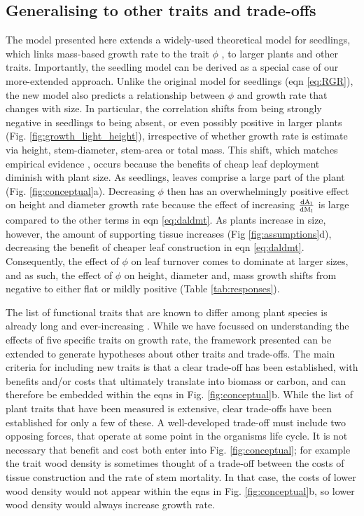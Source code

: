 \documentclass[a4paper,11pt]{article}
\begin{document}
\subsection{Generalising to other traits and trade-offs}


The model presented here extends a widely-used theoretical model for seedlings, which links mass-based growth rate to the trait $\phi$ \citep{Lambers-1992, Wright-2000}, to larger plants and other traits. Importantly, the seedling model can be derived as a special case of our more-extended approach. Unlike the original model for seedlings (eqn \ref{eq:RGR}), the new model also predicts a relationship between $\phi$ and growth rate that changes with size. In particular, the correlation shifts from being strongly negative in seedlings to being absent, or even possibly positive in larger plants (Fig. \ref{fig:growth_light_height}), irrespective of whether growth rate is estimate via height, stem-diameter, stem-area or total mass. This shift, which matches empirical evidence \citep{Poorter-2008, Wright-2010, Herault-2011, Paine-2015, Gibert-2016}, occurs because the benefits of cheap leaf deployment diminish with plant size. As seedlings, leaves comprise a large part of the plant (Fig. \ref{fig:conceptual}a). Decreasing $\phi$ then has an overwhelmingly positive effect on height and diameter growth rate because the effect of increasing $\frac{\rm{d} A_{\rm l}}{\rm{d} M_{\rm l}}$ is large compared to the other terms in eqn \ref{eq:daldmt}. As plants increase in size, however, the amount of supporting tissue increases (Fig \ref{fig:assumptions}d), decreasing the benefit of cheaper leaf construction in eqn \ref{eq:daldmt}. Consequently, the effect of $\phi$ on leaf turnover comes to dominate at larger sizes, and as such, the effect of $\phi$ on height, diameter and, mass growth shifts from negative to either flat or mildly positive  (Table \ref{tab:responses}).

The list of functional traits that are known to differ among plant species is already long and ever-increasing \citep{Perez-2013}. While we have focussed on understanding the effects of five specific traits on growth rate, the framework presented can be extended to generate hypotheses about other traits and trade-offs. The main criteria for including new traits is that a clear trade-off has been established, with benefits and/or costs that ultimately translate into biomass or carbon, and can therefore be embedded within the eqns in Fig. \ref{fig:conceptual}b. While the list of plant traits that have been measured is extensive, clear trade-offs have been established for only a few of these. A well-developed  trade-off must include two opposing forces, that operate at some point in the organisms life cycle. It is not necessary that benefit and cost both enter into Fig. \ref{fig:conceptual}; for example the trait wood density is sometimes thought of a trade-off between the costs of tissue construction and the rate of stem mortality. In that case, the costs of lower wood density would not appear within the eqns in Fig. \ref{fig:conceptual}b, so lower wood density would always increase growth rate.
\end{document}
